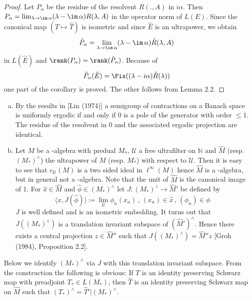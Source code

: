 \begin{proof}
Let $P_{\alpha}$ be the residue of the resolvent $R(.,A)$ in $i\alpha$.
Then $P_{\alpha} = \lim_{\lambda \to \im\,\alpha}(\lambda - \im\,\alpha)R(\lambda,A)$ in the operator norm of $L(E)$.
Since the canonical map $(T \mapsto \hat{T})$ is isometric and since $\hat{E}$ is an ultrapower, we obtain
\[
\hat{P}_{\alpha} = \lim_{\lambda \to \im\,\alpha}(\lambda - \im\,\alpha)\hat{R}(\lambda,A)
\]
in $L(\hat{E})$ and $\rank(P_{\alpha}) = \rank(\hat{P}_{\alpha})$.
Because of
\[
\hat{P}_{\alpha}(\hat{E}) = \Fix((\lambda-i\alpha)\hat{R}(\lambda))
\]
one part of the corollary is proved. The other follows from Lemma 2.2.
\end{proof}

\begin{remarks}\label{rem:d3-2.4}
\begin{enumerate}[(a)]
\item
By the results in [Lin (1974)] a semigroup of contractions on a Banach space is uniformly ergodic if and only if $0$ is a pole of the generator with order $\leq 1$.
The residue of the resolvent in $0$ and the associated ergodic projection are identical.
\item
Let $M$ be a \WA-algebra with predual $M_{*}$, $\mathcal{U}$ a free ultrafilter on $\mathbb{N}$ and $\hat{M}$ (resp. $(M_{*})^{\wedge}$) the ultrapower of $M$ (resp. $M_{*}$) with respect to $\mathcal{U}$.
Then it is easy to see that $c_{\mathcal{U}}(M)$ is a two sided ideal in $\ell^{\infty}(M)$ hence $\hat{M}$ is a \CA-algebra, but in general not a \WA-algebra.
Note that the unit of $\hat{M}$ is the canonical image of $1$.
For $\hat{x} \in \hat{M}$ and $\hat{\phi} \in (M_{*})^{\wedge}$ let $J: (M_{*})^{\wedge} \to \hat{M}'$ be defined by
\[
\langle x,J(\hat{\phi}) \rangle \coloneqq \lim_{\mathcal{U}}\phi_{n}(x_{n}) \, , \, (x_{n}) \in \hat{x} \, , \, (\phi_{n}) \in \hat{\phi}
\]
$J$ is well defined and is an isometric embedding.
It turns out that $J((M_{*})^{\wedge})$ is a translation invariant subspace of $(\hat{M}')^{\wedge}$.
Hence there exists a central projection $z \in \hat{M}''$ such that $J((M_{*})^{\wedge}) = \hat{M}''z$ [Groh (1984), Proposition 2.2].
\end{enumerate}
\end{remarks}





Below we identify $(M_{*})^{\wedge}$ via $J$ with this translation invariant subspace.
From the construction the following is obvious: If $T$ is an identity preserving Schwarz map with preadjoint $T_{*} \in L(M_{*})$, then $\hat{T}$ is an identity preserving Schwarz map on $\hat{M}$ such that $(T_{*})^{\wedge} = \hat{T}'|(M_{*})^{\wedge}$.

